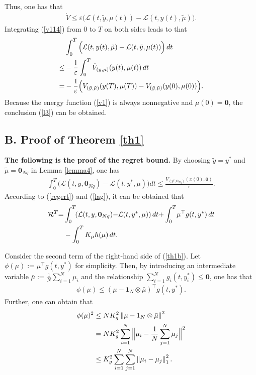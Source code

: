 \documentclass[final,5p,times,twocolumn,authoryear]{elsarticle}
\begin{document}
	Thus, one has that
	\begin{align}
		\dot{V}\le \varepsilon \Big(\mathcal{{L}}(t,\tilde y,\mu(t))- \mathcal{{L}}(t,y(t),\tilde{\mu})\Big).\label{v114}
	\end{align}
	Integrating (\ref{v114}) from $0$ to $T$ on both sides leads to that
	\begin{align}
		&\int_{0}^{T} \Big( \mathcal{L}(t,y(t),\tilde{\mu})-\mathcal{L}(t,\tilde{y},\mu(t))\Big) \,dt\notag\\
		\le&-\frac{1}{\varepsilon}\int_{0}^{T} \dot{V}_{(\tilde{y}, \tilde{\mu})} (y(t), \mu(t)) \,dt\notag\\
		=&-\frac{1}{\varepsilon}\Big(V_{(\tilde{y}, \tilde{\mu})}(y(T), \mu(T)) - V_{(\tilde{y}, \tilde{\mu})}(y(0), \mu(0))\Big).
	\end{align}
	Because the energy function (\ref{v1}) is always nonnegative and $\mu(0)=\boldsymbol{0}$, the conclusion (\ref{l3}) can be obtained.
	
	
	\subsection*{B. Proof of Theorem \ref{th1}}\label{pth1}
	\textbf{The following is the proof of the regret bound.} 
	By choosing $\tilde{y}=y^*$ and $\tilde{\mu}=\boldsymbol{0}_{Nq}$ in Lemma \ref{lemma4}, one has
	\begin{align}
		\int_{0}^{T} \Big(\mathcal{L}(t,y,\boldsymbol{0}_{Nq}) - \mathcal{L}(t,y^*,\mu)\Big)dt\le\frac{V_{(y^*, \boldsymbol{0}_{Nq})}(x(0), \boldsymbol{0})}{\varepsilon}.\label{th1a}
	\end{align}
	According to (\ref{regert}) and (\ref{lag}), it can be obtained that
	\begin{align}
		\mathcal{R}^T{=}
		&\int_{0}^{T} \!\!\left(\mathcal{L}(t,y,\boldsymbol{0}_{Nq}) {-} \mathcal{L}(t,y^*,\mu)\right)dt
		{+}\int_{0}^{T} \!\mu^\top g(t,y^*)\, dt\notag\\
		&-\int_{0}^{T} K_\mu h(\mu)\, dt.\label{th1b}
	\end{align}	
	
	Consider the second term of the right-hand side of (\ref{th1b}). Let $\phi(\mu):=\mu^\top g(t,y^*)$ for simplicity. Then, by introducing an intermediate variable $\bar{\mu}:=\frac{1}{N}\sum_{i=1}^{N}\mu_i$ and the relationship $\sum_{i=1}^{N} g_{i}(t, y_i^*) \le \boldsymbol0$, one has that
	\begin{align}
		\phi(\mu)\le(\mu-\boldsymbol{1}_N\otimes \bar{\mu})^\top g(t,y^*).\label{phi1}
	\end{align}
	Further, one can obtain that
	\begin{align}
		\phi(\mu)^2
		&\le NK_g^2\left\|\mu-1_N\otimes \bar{\mu}\right\|^2\notag\\
		&= NK_g^2 \sum_{i=1}^{N} \Big\|\mu_i-\frac{1}{N}\sum_{j=1}^{N}\mu_j\Big\|^2\notag\\
		&\le K_g^2 \sum_{i=1}^{N} \sum_{j=1}^{N} \left\|\mu_i-\mu_j\right\|_1^2.\label{phi2}
	\end{align}
	
\end{document}
